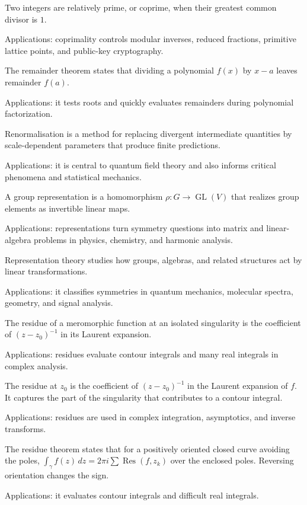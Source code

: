 Two integers are relatively prime, or coprime, when their greatest common divisor is $1$. \par\noindent Applications: coprimality controls modular inverses, reduced fractions, primitive lattice points, and public-key cryptography.

The remainder theorem states that dividing a polynomial $f(x)$ by $x-a$ leaves remainder $f(a)$. \par\noindent Applications: it tests roots and quickly evaluates remainders during polynomial factorization.

Renormalisation is a method for replacing divergent intermediate quantities by scale-dependent parameters that produce finite predictions. \par\noindent Applications: it is central to quantum field theory and also informs critical phenomena and statistical mechanics.

A group representation is a homomorphism $\rho:G\to\operatorname{GL}(V)$ that realizes group elements as invertible linear maps. \par\noindent Applications: representations turn symmetry questions into matrix and linear-algebra problems in physics, chemistry, and harmonic analysis.

Representation theory studies how groups, algebras, and related structures act by linear transformations. \par\noindent Applications: it classifies symmetries in quantum mechanics, molecular spectra, geometry, and signal analysis.

The residue of a meromorphic function at an isolated singularity is the coefficient of $(z-z_0)^{-1}$ in its Laurent expansion. \par\noindent Applications: residues evaluate contour integrals and many real integrals in complex analysis.

The residue at $z_0$ is the coefficient of $(z-z_0)^{-1}$ in the Laurent expansion of $f$. It captures the part of the singularity that contributes to a contour integral. \par\noindent Applications: residues are used in complex integration, asymptotics, and inverse transforms.

The residue theorem states that for a positively oriented closed curve avoiding the poles, $\int_\gamma f(z)\,dz=2\pi i\sum\operatorname{Res}(f,z_k)$ over the enclosed poles. Reversing orientation changes the sign. \par\noindent Applications: it evaluates contour integrals and difficult real integrals.

